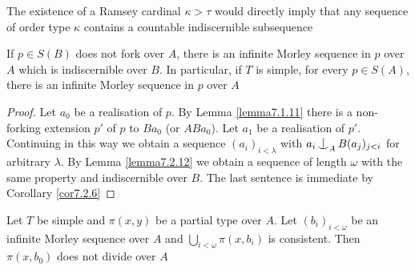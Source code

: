 \documentclass[11pt]{article}
\begin{document}
The existence of a Ramsey cardinal \(\kappa>\tau\) would directly imply that any sequence of order type
\(\kappa\) contains a countable indiscernible subsequence

\begin{lemma}[]
\label{lemma7.2.13}
If \(p\in S(B)\) does not fork over \(A\), there is an infinite Morley sequence in \(p\)
over \(A\) which is indiscernible over \(B\). In particular, if \(T\) is simple, for
every \(p\in S(A)\), there is an infinite Morley sequence in \(p\) over \(A\)
\end{lemma}

\begin{proof}
Let \(a_0\) be a realisation of \(p\). By Lemma \ref{lemma7.1.11} there is a non-forking
extension \(p'\) of \(p\) to \(Ba_0\) (or \(ABa_0\)). Let \(a_1\) be a realisation of \(p'\). Continuing in this
way we obtain a sequence \((a_i)_{i<\lambda}\) with \(a_i\ind_AB(a_j)_{j<i}\) for arbitrary \(\lambda\). By Lemma
\ref{lemma7.2.12} we obtain a sequence of length \(\omega\) with the same property and indiscernible
over \(B\). The last sentence is immediate by Corollary \ref{cor7.2.6}
\end{proof}

\begin{proposition}
\label{prop7.2.14}
Let \(T\) be simple and \(\pi(x,y)\) be a partial type over \(A\). Let \((b_i)_{i<\omega}\) be an
infinite Morley sequence over \(A\) and \(\bigcup_{i<\omega}\pi(x,b_i)\) is consistent. Then \(\pi(x,b_0)\)
does not divide over \(A\)
\end{proposition}
\end{document}
